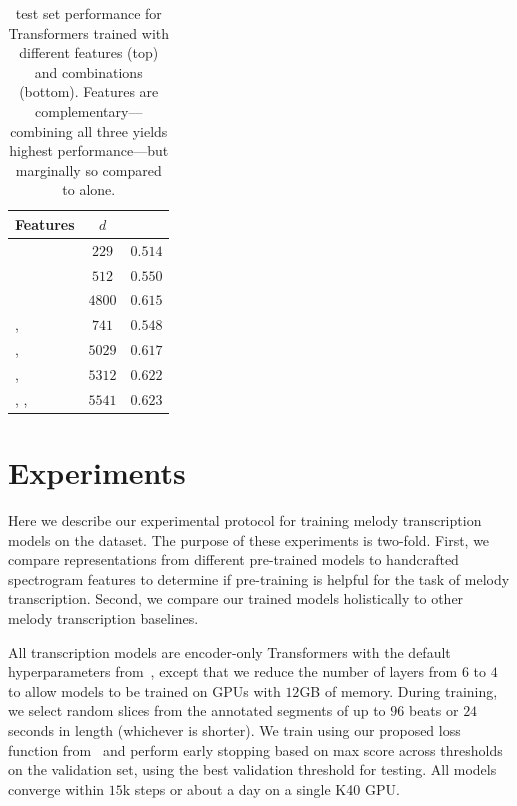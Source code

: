 \begin{table}[t]
    \centering
    \begin{tabular}{lcc}
\toprule
Features & $d$ & \fone{} \\
\midrule
\mel{} & $229$ & $0.514$ \\
\mtthree{} & $512$ & $0.550$ \\
\jukebox{} & $4800$ & $\bm{0.615}$ \\
\midrule
\mel{}, \mtthree{} & $741$ & $0.548$ \\
\mel{}, \jukebox{} & $5029$ & $0.617$ \\
\mtthree{}, \jukebox{} & $5312$ & $0.622$ \\
\mel{}, \mtthree{}, \jukebox{} & $5541$ & $\bm{0.623}$ \\
\bottomrule
    \end{tabular}
    \caption{\hooktheory{} test set performance for Transformers trained with different features (top) and combinations (bottom). Features are complementary---combining all three yields highest performance---but marginally so compared to \jukebox{} alone.}
    \label{tab:hooktheory_test}
\end{table}

\section{Experiments}
\label{sec:experiments}

Here we describe our experimental protocol for training melody transcription models on the \hooktheory{} dataset. 
The purpose of these experiments is two-fold. 
First, we compare representations from different pre-trained models to handcrafted spectrogram features to determine if pre-training is helpful for the task of melody transcription. 
Second, we compare our trained models holistically to other melody transcription baselines. 

All transcription models are encoder-only Transformers with the default hyperparameters from~\cite{vaswani2017attention}, 
except that we reduce the number of layers from $6$ to $4$ to allow models to be trained on GPUs with $12$GB of memory. 
During training, we select random slices from the annotated segments of up to $96$ beats or $24$ seconds in length (whichever is shorter). 
We train using our proposed loss function from~ and perform early stopping based on max \fone{} score across thresholds on the validation set, using the best validation threshold for testing. 
All models converge within $15$k steps or about a day on a single K40 GPU. 

